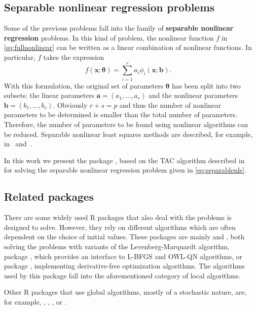 \subsection{Separable nonlinear regression problems}
Some of the previous problems fall into the family of \textbf{separable nonlinear regression} problems. In this kind of problem, the nonlinear function $f$ in \eqref{eq:fullnonlinear} can be written as a linear combination of nonlinear functions. In particular, $f$ takes the expression
\begin{equation}
\label{eq:separablenls}
    f(\mathbf{x};\boldsymbol\theta) = \sum_{i = 1}^r a_i \phi_i(\mathbf{x};\mathbf{b}).
\end{equation}
With this formulation, the original set of parameters $\boldsymbol\theta$ has been split into two subsets: the linear parameters $\mathbf{a}=(a_1,\dots,a_r)$   and the nonlinear parameters $\mathbf{b}= (b_1,\ldots,b_s)$. Obviously $r+s = p$ and thus the number of nonlinear parameters to be determined is smaller than the total number of parameters. Therefore, the number of parameters to be found using nonlinear algorithms can be reduced. Separable nonlinear least squares methods are described, for example, in~\citet{golub_separable} and~\citet{golub_differentiation}.

In this work we present the package , based on the TAC algorithm described in~\citet{tac} for solving the separable nonlinear regression problem given in \eqref{eq:separablenls}.



\subsection{Related packages}
There are some widely used R packages that also deal with the problems  is designed to solve. However, they rely on different algorithms which are often dependent on the choice of initial values. These packages are mainly  \citep{package_nlsr} and , both solving the problems with variants of the Levenberg-Marquardt algorithm,  package \citep{package_lbfgs}, which provides an interface to L-BFGS and OWL-QN algorithms, or  package \citep{package_minqa}, implementing derivative-free optimization algorithms. The algorithms used by this package fall into the aforementioned category of local algorithms.

Other R packages that use global algorithms, mostly of a stochastic nature, are, for example,  \citep{package_DEoptimR},  \citep{package_GenSA},  \citep{package_GA},  \citep{package_ABCoptim} or  \citep{package_pso}. 


